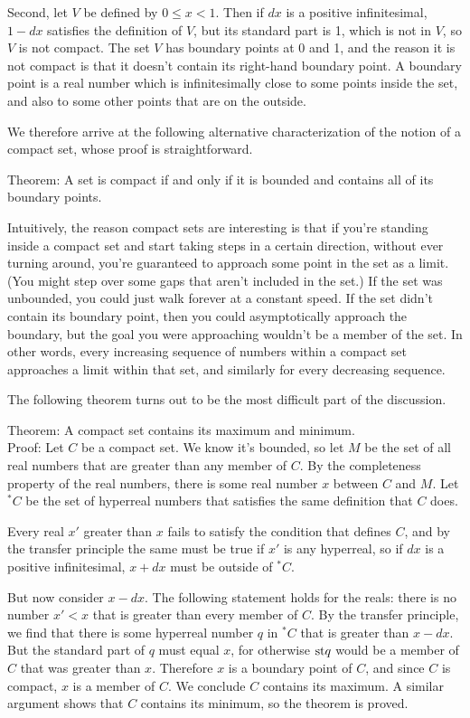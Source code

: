 Second, let $V$ be defined by $0 \le x < 1$. Then if $dx$ is a positive infinitesimal,
$1-dx$ satisfies the definition of $V$, but its standard part is 1, which is not in $V$, so $V$
is not compact. The set $V$ has boundary points at 0 and 1, and the reason it is not compact
is that it doesn't contain its right-hand boundary point. A boundary point
is a real number which is infinitesimally close to some points inside the set, and also to some
other points that are on the outside.

We therefore arrive at the following alternative characterization of the notion of a compact
set, whose proof is straightforward.

Theorem: A set is compact if and only if it is bounded and contains all of its boundary points.

Intuitively, the reason compact sets are interesting is that if you're standing inside a compact
set and start taking steps in a certain direction, without ever turning around, you're guaranteed to
approach some point in the set as a limit. (You might step over some gaps that aren't included in the set.)
If the set was unbounded, you could just walk forever at a constant speed.
If the set didn't contain its boundary point, then you could asymptotically approach the boundary, but
the goal you were approaching wouldn't be a member of the set. In other words, every increasing
sequence of numbers within a compact set approaches a limit within that set, and similarly for every
decreasing sequence.

The following theorem turns out to be the most difficult part of the discussion.

Theorem: A compact set contains its maximum and minimum.\\
Proof: Let $C$ be a compact set. We know it's bounded, so let $M$ be the set of all real numbers
that are greater than any member of $C$. By the completeness property of the real
numbers, there is some real number $x$ between $C$ and $M$. Let $^{*}C$ be the set of hyperreal numbers that satisfies the same
definition that $C$ does.

Every real $x'$ greater than $x$ fails
to satisfy the condition that defines $C$, and by the transfer principle the same must be true if $x'$ is any hyperreal,
so if $dx$ is a positive infinitesimal, $x+dx$ must be outside of $^{*}C$. 

But now consider $x-dx$.
The following statement holds for the reals: there is no number $x'<x$ that is greater than every
member of $C$. By the transfer principle, we find that there is some hyperreal number $q$ in $^{*}C$
that is greater than $x-dx$. But the standard part of $q$ must equal $x$, for otherwise $\textup{st} q$ would
be a member of $C$ that was greater than $x$.
Therefore $x$ is a boundary point of $C$, and since
$C$ is compact, $x$ is a member of $C$. We conclude $C$ contains its maximum. A similar argument shows that
$C$ contains its minimum, so the theorem is proved.


